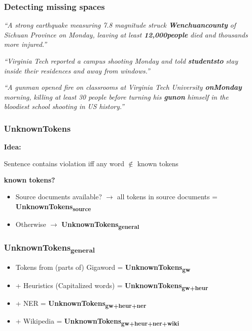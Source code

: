 \documentclass[table]{beamer}
\begin{document}
\begin{frame}
  \frametitle{Detecting missing spaces}
  \textit{``A strong earthquake measuring 7.8 magnitude struck \textbf{Wenchuancounty} of Sichuan Province on Monday, leaving at least \textbf{12,000people} died and thousands more injured.''}

  \vspace{0.5cm}
  \textit{``Virginia Tech reported a campus shooting Monday and told \textbf{studentsto} stay inside their residences and away from windows.''}

  \vspace{0.5cm}
  \textit{``A gunman opened fire on classrooms at Virginia Tech University \textbf{onMonday} morning, killing at least 30 people before turning his \textbf{gunon} himself in the bloodiest school shooting in US history.''}
\end{frame}

\begin{frame}
  \frametitle{\textbf{UnknownTokens}}
  \textbf{Idea:}

  Sentence contains violation iff any word $\not\in$ known tokens
  \pause
  \vspace{0.6cm}

  \textbf{known tokens?}
  \begin{itemize}
    \item Source documents available? $\rightarrow$ all tokens in source documents = \textbf{UnknownTokens\textsubscript{source}}
    \item Otherwise $\rightarrow$ \textbf{UnknownTokens\textsubscript{general}}
  \end{itemize}
\end{frame}

\begin{frame}
  \frametitle{\textbf{UnknownTokens\textsubscript{general}}}
  \begin{itemize}
    \item Tokens from (parts of) Gigaword = \textbf{UnknownTokens\textsubscript{gw}}\pause
    \item + Heuristics (Capitalized words) = \textbf{UnknownTokens\textsubscript{gw+heur}}\pause
    \item + NER \citep{stanfordNER} = \textbf{UnknownTokens\textsubscript{gw+heur+ner}}\pause
    \item + Wikipedia = \textbf{UnknownTokens\textsubscript{gw+heur+ner+wiki}}
  \end{itemize}
\end{frame}
\end{document}

